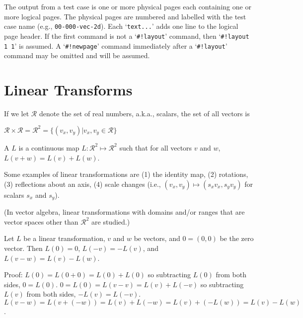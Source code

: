 \documentclass[12pt]{article}
\begin{document}
The output from a test case is one or more physical pages
each containing one or more logical pages.  The physical
pages are numbered and labelled with the test case name
(e.g., {\tt 00-000-vec-2d}).  Each `{\tt text...}' adds one
line to the logical page header.  If the first command is
not a `{\tt \#!layout}' command, then `{\tt \#!layout 1 1}'
is assumed.  A `{\tt \#!newpage}' command immediately after a
`{\tt \#!layout}' command may be omitted and will be assumed.

\newpage

\section{Linear Transforms}
If we let $\mathcal{R}$ denote the set of real numbers,
a.k.a., scalars, the set of all vectors is \\
\centerline{
$\mathcal{R}\times\mathcal{R}=\mathcal{R}^2
    =\{(v_x,v_y)|v_x,v_y\in \mathcal{R}\}$}

\begin{definition}\label{LINEAR-TRANSFORMATION}
A  $L$ is a continuous map
$L:\mathcal{R}^2\mapsto\mathcal{R}^2$ such that for
all vectors $v$ and $w$, $L(v+w)=L(v)+L(w)$.
\end{definition}

Some examples of linear transformations are (1) the identity map,
(2) rotations, (3) reflections about an axis, (4) scale changes
(i.e., $(v_x,v_y)\longmapsto(s_x v_x,s_y v_y)$ for scalars $s_x$
and $s_y$).

(In vector algebra, linear transformations with domains and/or ranges
that are vector spaces other than $\mathcal{R}^2$ are studied.)


\begin{lemma}
Let $L$ be a linear transformation, $v$ and $w$ be vectors,
and $0=(0,0)$ be the zero vector.  Then $L(0)=0$,  $L(-v)=-L(v)$,
and $L(v-w) = L(v) - L(w)$.
\end{lemma}
\begin{indpar}{0.5in}
Proof: $L(0) = L(0+0)= L(0) + L(0)$ so subtracting $L(0)$
from both sides, $0=L(0)$.  $0 = L(0) = L(v-v) = L(v) + L(-v)$
so subtracting $L(v)$ from both sides, $-L(v)=L(-v)$.
$L(v-w)=L(v+(-w))=L(v)+L(-w)=L(v)+(-L(w))=L(v)-L(w)$.
\end{indpar}
\end{document}
